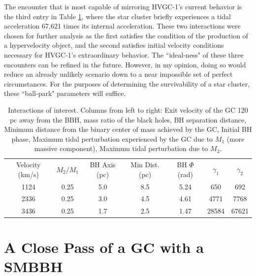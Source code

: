 \documentclass{aastex62}
\begin{document}
The encounter that is most capable of mirroring HVGC-1's current behavior is the third entry in Table \ref{results}, where the star cluster briefly experiences a tidal acceleration 67,621 times its internal acceleration. These two interactions were chosen for further analysis as the first satisfies the condition of the production of a hypervelocity object, and the second satisfies initial velocity conditions necessary for HVGC-1's extraordinary behavior. The ``ideal-ness" of these three encounters can be refined in the future. However, in my opinion, doing so would reduce an already unlikely scenario down to a near impossible set of perfect circumstances. For the purposes of determining the survivability of a star cluster, these ``ball-park" parameters will suffice. 

\begin{table}
\centering
\caption{Interactions of interest. Columns from left to right: Exit velocity of the GC 120 pc away from the BBH, mass ratio of the black holes, BH separation distance, Minimum distance from the binary center of mass achieved by the GC, Initial BH phase, Maximum tidal perturbation experienced by the GC due to $M_{1}$ (more massive component), Maximum tidal perturbation due to $M_{2}$. \label{results}}

\begin{tabular}{ccccccc}
\hline \hline
Velocity (km/s) & $M_{2}/M_{1}$ & BH Axis (pc) & Min Dist. (pc) & BH $\Phi$ (rad) & $\gamma_{1}$ & $\gamma_{2}$  \\
1124 & 0.25 & 5.0 & 8.5 & 5.24 & 650 & 692 \\
2336 & 0.25 & 3.0 & 4.5 & 4.61 & 4771 & 7768 \\
3436 & 0.25 & 1.7 & 2.5 & 1.47 & 28584 & 67621 \\
\end{tabular}
\end{table}



\section{A Close Pass of a GC with a SMBBH}
\end{document}
